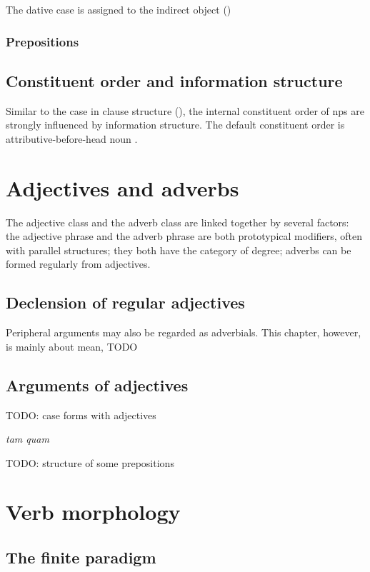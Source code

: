 \documentclass[a4paper, oneside]{report}
\newcommand*{\citepage}[1]{p.~{#1}}
\newcommand{\form}[1]{\emph{#1}}
\begin{document}
The dative case is assigned to the indirect object ()

\subsection{Prepositions}

\section{Constituent order and information structure}

Similar to the case in clause structure (),
the internal constituent order of \acs{np}s are strongly influenced by 
information structure.
The default constituent order is attributive-before-head noun
\citep[\citepage{396}]{allen1903allen}.

\chapter{Adjectives and adverbs}

The adjective class and the adverb class are linked together by several factors:
the adjective phrase and the adverb phrase are both prototypical modifiers,
often with parallel structures;
they both have the category of degree; 
adverbs can be formed regularly from adjectives.

\section{Declension of regular adjectives}

Peripheral arguments may also be regarded as adverbials.
This chapter, however, is mainly about mean, TODO

\section{Arguments of adjectives}

TODO: case forms with adjectives


\form{tam quam}

TODO: structure of some prepositions


\chapter{Verb morphology}

\section{The finite paradigm}
\end{document}
